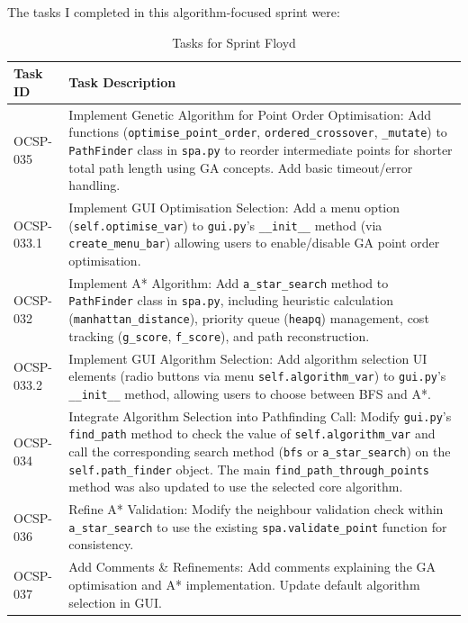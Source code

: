 The tasks I completed in this algorithm-focused sprint were:
\begin{table}[htbp]
	\centering
	\begin{tabularx}{\textwidth}{|l|X|}
		\hline
		\textbf{Task ID} & \textbf{Task Description} \\
		\hline
		OCSP-035 & Implement Genetic Algorithm for Point Order Optimisation: Add functions (\verb|optimise_point_order|, \verb|ordered_crossover|, \verb|_mutate|) to \verb|PathFinder| class in \verb|spa.py| to reorder intermediate points for shorter total path length using GA concepts. Add basic timeout/error handling. \\
		\hline
		OCSP-033.1 & Implement GUI Optimisation Selection: Add a menu option (\verb|self.optimise_var|) to \verb|gui.py|'s \verb|__init__| method (via \verb|create_menu_bar|) allowing users to enable/disable GA point order optimisation. \\
		\hline
		OCSP-032 & Implement A* Algorithm: Add \verb|a_star_search| method to \verb|PathFinder| class in \verb|spa.py|, including heuristic calculation (\verb|manhattan_distance|), priority queue (\verb|heapq|) management, cost tracking (\verb|g_score|, \verb|f_score|), and path reconstruction. \\
		\hline
		OCSP-033.2 & Implement GUI Algorithm Selection: Add algorithm selection UI elements (radio buttons via menu \verb|self.algorithm_var|) to \verb|gui.py|'s \verb|__init__| method, allowing users to choose between BFS and A*. \\
		\hline
		OCSP-034 & Integrate Algorithm Selection into Pathfinding Call: Modify \verb|gui.py|'s \verb|find_path| method to check the value of \verb|self.algorithm_var| and call the corresponding search method (\verb|bfs| or \verb|a_star_search|) on the \verb|self.path_finder| object. The main \verb|find_path_through_points| method was also updated to use the selected core algorithm. \\
		\hline
		OCSP-036 & Refine A* Validation: Modify the neighbour validation check within \verb|a_star_search| to use the existing \verb|spa.validate_point| function for consistency. \\
		\hline
		OCSP-037 & Add Comments \& Refinements: Add comments explaining the GA optimisation and A* implementation. Update default algorithm selection in GUI. \\
		\hline
	\end{tabularx}
	\caption{Tasks for Sprint Floyd}
\end{table}

